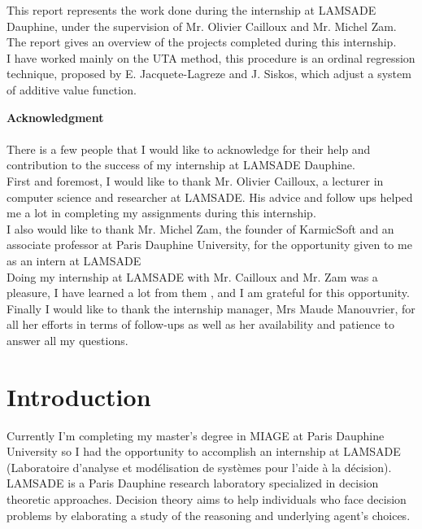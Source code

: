 \documentclass{report}
\begin{document}


\abstract 
This report represents the work done during the internship at LAMSADE Dauphine, under the supervision of Mr. Olivier Cailloux and Mr. Michel Zam. The report gives an overview of the projects completed during this internship.\\
I have worked mainly on the UTA method, this procedure is an ordinal regression technique, proposed by E. Jacquete-Lagreze and J. Siskos, which adjust a system of additive value function.

\newpage
{ \huge \bfseries Acknowledgment}\\[0.3cm]
\\

There is a few people that I would like to acknowledge for their help and contribution to the success of my internship at LAMSADE Dauphine.\\

First and foremost, I would like to thank Mr. Olivier Cailloux, a lecturer in computer science and researcher at LAMSADE. His advice and follow ups helped me a lot in completing my assignments during this internship.\\

I also would like to thank Mr. Michel Zam, the founder of KarmicSoft and an associate professor at Paris Dauphine University, for the opportunity given to me as an intern at LAMSADE\\

Doing my internship at LAMSADE with Mr. Cailloux and Mr. Zam was a pleasure, I have learned a lot from them , and I am grateful for this opportunity.\\

Finally I would like to thank the internship manager, Mrs Maude Manouvrier, for all her efforts in terms of follow-ups as well as her availability and patience to answer all my questions.\\

\newpage
\tableofcontents{}
\newpage
{}

\chapter{Introduction}
Currently I'm completing my master's degree in MIAGE at Paris Dauphine University so I had the opportunity to accomplish an internship at LAMSADE (Laboratoire d'analyse et modélisation de systèmes pour l'aide à la décision). LAMSADE is a Paris Dauphine research laboratory specialized in decision theoretic approaches. Decision theory aims to help individuals who face decision problems by elaborating a study of the reasoning and underlying agent's choices. \\
\end{document}
